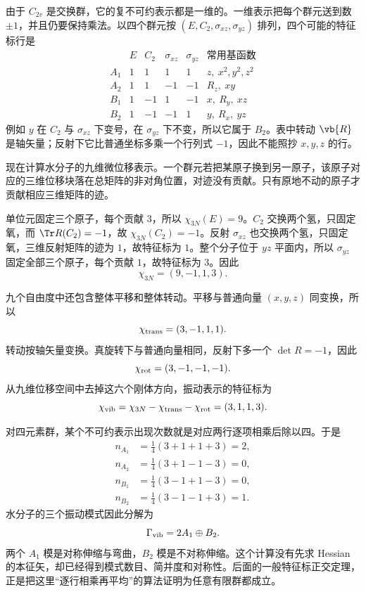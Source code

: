 由于 \(C_{2v}\) 是交换群，它的复不可约表示都是一维的。一维表示把每个群元送到数 \(\pm1\)，并且仍要保持乘法。以四个群元按
\((E,C_2,\sigma_{xz},\sigma_{yz})\) 排列，四个可能的特征标行是
\begin{equation}
\begin{array}{c|rrrr|l}
 &E&C_2&\sigma_{xz}&\sigma_{yz}&\text{常用基函数}\\ \hline
A_1&1& 1& 1& 1&z,\ x^2,y^2,z^2\\
A_2&1& 1&-1&-1&R_z,\ xy\\
B_1&1&-1& 1&-1&x,\ R_y,\ xz\\
B_2&1&-1&-1& 1&y,\ R_x,\ yz
\end{array}
\label{eq:water-c2v-character-table}
\end{equation}
例如 \(y\) 在 \(C_2\) 与 \(\sigma_{xz}\) 下变号，在
\(\sigma_{yz}\) 下不变，所以它属于 \(B_2\)。表中转动
\(\vb{R}\) 是轴矢量；反射下它比普通坐标多乘一个行列式
\(-1\)，因此不能照抄 \(x,y,z\) 的行。

现在计算水分子的九维微位移表示。一个群元若把某原子换到另一原子，该原子对应的三维位移块落在总矩阵的非对角位置，对迹没有贡献。只有原地不动的原子才贡献相应三维矩阵的迹。

单位元固定三个原子，每个贡献 \(3\)，所以
\(\chi_{3N}(E)=9\)。\(C_2\) 交换两个氢，只固定氧，而
\(\Tr R(C_2)=-1\)，故
\(\chi_{3N}(C_2)=-1\)。反射
\(\sigma_{xz}\) 也交换两个氢，只固定氧，三维反射矩阵的迹为
\(1\)，故特征标为 \(1\)。整个分子位于 \(yz\) 平面内，所以
\(\sigma_{yz}\) 固定全部三个原子，每个贡献 \(1\)，故特征标为
\(3\)。因此
\begin{equation}
\chi_{3N}=(9,-1,1,3).
\label{eq:water-3n-character}
\end{equation}

九个自由度中还包含整体平移和整体转动。平移与普通向量
\((x,y,z)\) 同变换，所以
\[
\chi_{\rm trans}=(3,-1,1,1).
\]
转动按轴矢量变换。真旋转下与普通向量相同，反射下多一个
\(\det R=-1\)，因此
\[
\chi_{\rm rot}=(3,-1,-1,-1).
\]
从九维位移空间中去掉这六个刚体方向，振动表示的特征标为
\begin{equation}
\chi_{\rm vib}
=\chi_{3N}-\chi_{\rm trans}-\chi_{\rm rot}
=(3,1,1,3).
\label{eq:water-vibrational-character}
\end{equation}

对四元素群，某个不可约表示出现次数就是对应两行逐项相乘后除以四。于是
\[
\begin{aligned}
n_{A_1}&=\tfrac14(3+1+1+3)=2,\\
n_{A_2}&=\tfrac14(3+1-1-3)=0,\\
n_{B_1}&=\tfrac14(3-1+1-3)=0,\\
n_{B_2}&=\tfrac14(3-1-1+3)=1.
\end{aligned}
\]
水分子的三个振动模式因此分解为
\begin{equation}
\Gamma_{\rm vib}=2A_1\oplus B_2.
\label{eq:water-mode-decomposition}
\end{equation}
两个 \(A_1\) 模是对称伸缩与弯曲，\(B_2\) 模是不对称伸缩。这个计算没有先求 Hessian 的本征矢，却已经得到模式数目、简并度和对称性。后面的一般特征标正交定理，正是把这里“逐行相乘再平均”的算法证明为任意有限群都成立。

